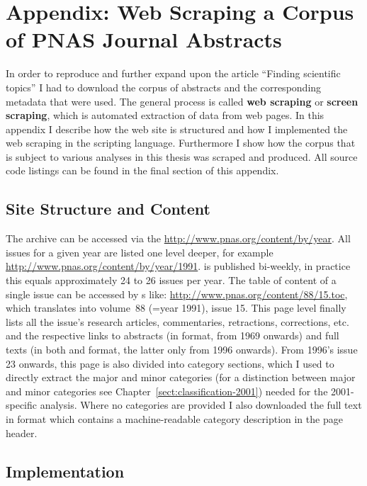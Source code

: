 \chapter{Appendix: Web Scraping a Corpus of PNAS Journal Abstracts}
\label{ch:web-scraping}

In order to reproduce and further expand upon the article ``Finding scientific topics'' \citep{Griffiths2004} I had to download the corpus of  abstracts and the corresponding metadata that were used. The general process is called \textbf{web scraping} or \textbf{screen scraping}, which is automated extraction of data from web pages. In this appendix I describe how the  web site is structured and how I implemented the web scraping in the  scripting language. Furthermore I show how the  corpus that is subject to various analyses in this thesis was scraped and produced. All source code listings can be found in the final section of this appendix.

\section{Site Structure and Content}
The  archive can be accessed via the  \url{http://www.pnas.org/content/by/year}. All issues for a given year are listed one level deeper, for example \url{http://www.pnas.org/content/by/year/1991}.  is published bi-weekly, in practice this equals approximately 24 to 26 issues per year. The table of content of a single issue can be accessed by s like: \url{http://www.pnas.org/content/88/15.toc}, which translates into volume~88 (=year 1991), issue 15. This page level finally lists all the issue's research articles, commentaries, retractions, corrections, etc. and the respective links to abstracts (in  format, from 1969 onwards) and full texts (in both  and  format, the latter only from 1996 onwards). 
From 1996's issue 23 onwards, this page is also divided into category sections, which I used to directly extract the major and minor categories (for a distinction between major and minor categories see Chapter~\ref{sect:classification-2001}) needed for the 2001-specific analysis.
Where no categories are provided I also downloaded the full text in  format which contains a machine-readable category description in the page header.

\section{Implementation}

